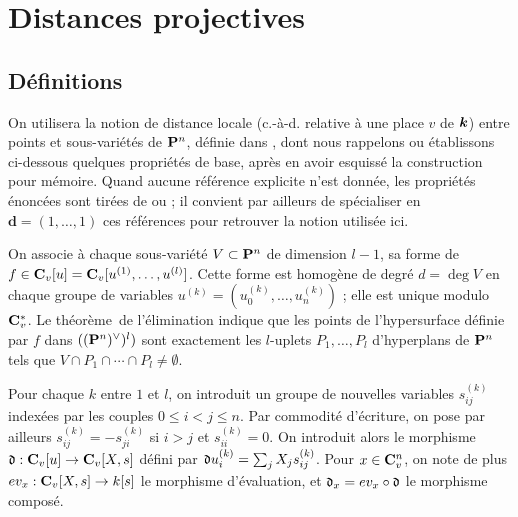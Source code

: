 
\chapter{Distances projectives} \label{chap:distv}


\section{Définitions} \label{sec:distv-def}

On utilisera la notion de distance locale (c.-à-d. relative à une place \( v
\) de \( {\boldsymbol k} \)) entre points et sous-variétés de \( {\mathbf{P}}^n \), définie dans
\cite{phidg}, dont nous rappelons ou établissons ci-dessous quelques
propriétés de base, après en avoir esquissé la construction pour mémoire.
Quand aucune référence explicite n'est donnée, les propriétés énoncées sont
tirées de \cite{phidg} ou \cite{remgdmp} ; il convient par ailleurs de
spécialiser en \( \mathbf{d} = (1, \dots, 1) \) ces références pour retrouver
la notion utilisée ici.

On associe à chaque sous-variété \( V \subset {\mathbf{P}}^n \) de dimension \( l-1
\), sa forme de  \( f \in {\mathbf{C}}_v[u] = {\mathbf{C}}_v[u^{(1)}, \dots, u^{(l)}]
\). Cette forme est homogène de degré \( d = \deg V \) en chaque groupe de
variables \( u^{(k)} = (u^{(k)}_0, \dots, u^{(k)}_n) \) ; elle est unique
modulo \( {\mathbf{C}}_v^{*} \).  Le théorème~de l'élimination indique que les points de
l'hypersurface définie par \( f \) dans \( (({\mathbf{P}}^n)^\vee)^l) \) sont
exactement les \( l \)-uplets \( P_1, \dots, P_l \) d'hyperplans de \( {\mathbf{P}}^n
\) tels que \( V \cap P_1 \cap \cdots \cap P_l \neq \emptyset \).

Pour chaque \( k \) entre \( 1 \) et \( l \), on introduit un groupe de
nouvelles variables \( s^{(k)}_{ij} \) indexées par les couples \( 0 \le i < j
  \le n \). Par commodité d'écriture, on pose par ailleurs \( s^{(k)}_{ij} = -
  s^{(k)}_{ji} \) si \( i > j \) et \( s^{(k)}_{ii} = 0 \). On introduit alors
le morphisme \( \mathfrak{d} : {\mathbf{C}}_v[u] \to {\mathbf{C}}_v[X, s] \) défini par \( \mathfrak{d} u^{(k)}_i =
  \sum_j X_j s^{(k)}_{ij} \). Pour \( x \in {\mathbf{C}}_v^n \), on note de plus \( ev_x
  : {\mathbf{C}}_v[X, s] \to k[s] \) le morphisme d'évaluation, et \( \mathfrak{d}_x = ev_x \circ
  \mathfrak{d} \) le morphisme composé.

